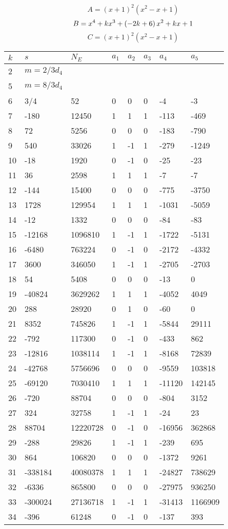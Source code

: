 \documentclass{amsart}
\begin{document}
$$A=(x
 + 1)^{2}(x^2
 - x
 + 1)$$
$$B=x^4
 + k\*x^3
 + \left(-2\*k
 + 6\right) \*x^2
 + k\*x
 + 1$$
$$C=(x
 + 1)^{2}(x^2
 - x
 + 1)$$
\begin{longtable}{|l|l|l|lllll|}
\hline
$k$ & $s$ & $N_E$ & $a_1$ & $a_2$ & $a_3$ & $a_4$ & $a_5$\\
\hline
2&$m=2/3d_{4}$&&\multicolumn{5}{c|}{}\\
5&$m=8/3d_{4}$&&\multicolumn{5}{c|}{}\\
6&3/4&52&0&0&0&-4&-3\\
7&-180&12450&1&1&1&-113&-469\\
8&72&5256&0&0&0&-183&-790\\
9&540&33026&1&-1&1&-279&-1249\\
10&-18&1920&0&-1&0&-25&-23\\
11&36&2598&1&1&1&-7&-7\\
12&-144&15400&0&0&0&-775&-3750\\
13&1728&129954&1&1&1&-1031&-5059\\
14&-12&1332&0&0&0&-84&-83\\
15&-12168&1096810&1&-1&1&-1722&-5131\\
16&-6480&763224&0&-1&0&-2172&-4332\\
17&3600&346050&1&-1&1&-2705&-2703\\
18&54&5408&0&0&0&-13&0\\
19&-40824&3629262&1&1&1&-4052&4049\\
20&288&28920&0&1&0&-60&0\\
21&8352&745826&1&-1&1&-5844&29111\\
22&-792&117300&0&-1&0&-433&862\\
23&-12816&1038114&1&-1&1&-8168&72839\\
24&-42768&5756696&0&0&0&-9559&103818\\
25&-69120&7030410&1&1&1&-11120&142145\\
26&-720&88704&0&0&0&-804&3152\\
27&324&32758&1&-1&1&-24&23\\
28&88704&12220728&0&-1&0&-16956&362868\\
29&-288&29826&1&-1&1&-239&695\\
30&864&106820&0&0&0&-1372&9261\\
31&-338184&40080378&1&1&1&-24827&738629\\
32&-6336&865800&0&0&0&-27975&936250\\
33&-300024&27136718&1&-1&1&-31413&1166909\\
34&-396&61248&0&-1&0&-137&393\\

\end{longtable}
\end{document}
